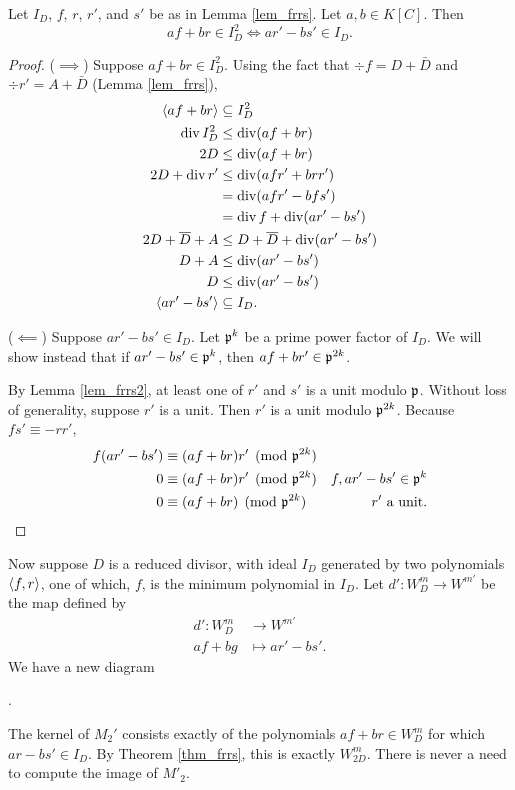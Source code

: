 \begin{theorem}
  \label{thm_frrs}
  Let $I_D$, $f$, $r$, $r'$, and $s'$ be as in Lemma \ref{lem_frrs}.
  Let $a, b \in K[C]$. Then
  \[ af + br \in I_D^2 \iff ar' - bs' \in I_D. \]
\end{theorem}
\begin{proof}
  ($\implies$)
  Suppose $af + br \in I_D^2$.
  Using the fact that $\div f = D + \bar D$
  and $\div r' = A + \bar D$ (Lemma \ref{lem_frrs}),
  \begin{align*}
    \left\langle af + br \right\rangle &\subseteq I_D^2 \\
    \operatorname{div} I_D^2 &\leq \operatorname{div}(af + br) \\
    2D &\leq \operatorname{div}(af + br) \\
    2D + \operatorname{div} r' &\leq \operatorname{div}(afr' + brr') \\
      &= \operatorname{div}(afr' - bfs') \\
      &= \operatorname{div} f + \operatorname{div}(ar' - bs') \\
    2D + \overline D + A &\leq D + \overline D + \operatorname{div}(ar' - bs') \\
    D + A &\leq \operatorname{div}(ar' - bs') \\
    D &\leq \operatorname{div}(ar' - bs') \\
    \left\langle ar' - bs' \right\rangle &\subseteq I_D.
  \end{align*}
  
  ($\impliedby$)
  Suppose $ar' - bs' \in I_D$.
  Let $\frak p^k$ be a prime power factor of $I_D$.
  We will show instead that if $ar' - bs' \in \frak p^k$, then $af + br' \in \frak p^{2k}$.
  
  By Lemma \ref{lem_frrs2}, at least one of $r'$ and $s'$ is a unit modulo $\frak p$.
  Without loss of generality, suppose $r'$ is a unit.
  Then $r'$ is a unit modulo $\frak p^{2k}$.
  Because $fs' \equiv -rr'$,
  \begin{align*}
    f(ar' - bs') &\equiv (af + br)r' \pmod{\frak p^{2k}} \\
    0 &\equiv (af + br)r' \pmod{\frak p^{2k}}
      & f, ar' - bs' \in \frak p^k \\
    0 &\equiv (af + br) \pmod{\frak p^{2k}}
      & \text{$r'$ a unit}.
  \end{align*}
\end{proof}

Now suppose $D$ is a reduced divisor,
with ideal $I_D$ generated by two polynomials $\left\langle f,r \right\rangle$,
one of which, $f$, is the minimum polynomial in $I_D$.
Let $d' : W_D^m \to W^{m'}$ be the map defined by
\begin{align*}
  d' : W_D^m &\to W^{m'} \\
  af + bg &\mapsto ar' - bs'.
\end{align*}
We have a new diagram
\begin{center}
  .
\end{center}
The kernel of $M_2'$ consists exactly of the polynomials $af + br \in W_D^m$ for which $ar - bs' \in I_D$.
By Theorem \ref{thm_frrs}, this is exactly $W_{2D}^m$.
There is never a need to compute the image of $M'_2$.

